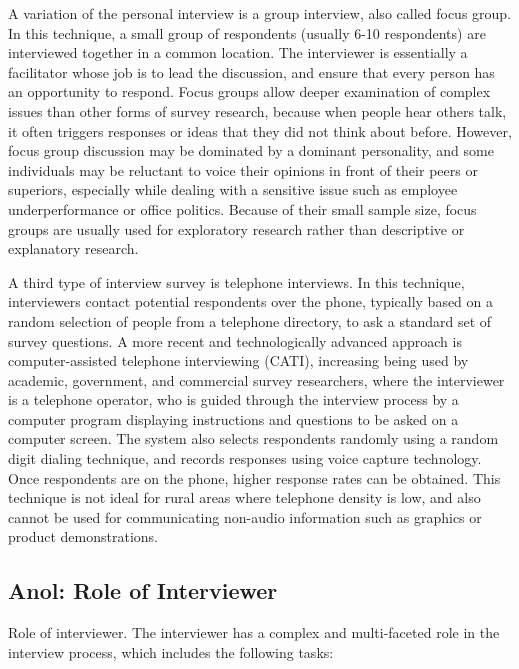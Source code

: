 A variation of the personal interview is a group interview, also called focus group. In this technique, a small group of respondents (usually 6-10 respondents) are interviewed together in a common location. The interviewer is essentially a facilitator whose job is to lead the discussion, and ensure that every person has an opportunity to respond. Focus groups allow deeper examination of complex issues than other forms of survey research, because when people hear others talk, it often triggers responses or ideas that they did not think about before. However, focus group discussion may be dominated by a dominant personality, and some individuals may be reluctant to voice their opinions in front of their peers or superiors, especially while dealing with a sensitive issue such as employee underperformance or office politics. Because of their small sample size, focus groups are usually used for exploratory research rather than descriptive or explanatory research.

A third type of interview survey is telephone interviews. In this technique, interviewers contact potential respondents over the phone, typically based on a random selection of people from a telephone directory, to ask a standard set of survey questions. A more recent and technologically advanced approach is computer-assisted telephone interviewing (CATI), increasing being used by academic, government, and commercial survey researchers, where the interviewer is a telephone operator, who is guided through the interview process by a computer program displaying instructions and questions to be asked on a computer screen. The system also selects respondents randomly using a random digit dialing technique, and records responses using voice capture technology. Once respondents are on the phone, higher response rates can be obtained. This technique is not ideal for rural areas where telephone density is low, and also cannot be used for communicating non-audio information such as graphics or product demonstrations.

\subsection{Anol: Role of Interviewer}

Role of interviewer. The interviewer has a complex and multi-faceted role in the interview process, which includes the following tasks:

